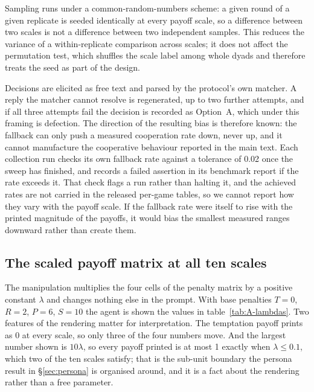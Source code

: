 \documentclass[openacc]{rsproca_new}
\newcommand{\lam}{\lambda}
\begin{document}

Sampling runs under a common-random-numbers scheme: a given round of a given
replicate is seeded identically at every payoff scale, so a difference between
two scales is not a difference between two independent samples. This reduces
the variance of a within-replicate comparison across scales; it does not
affect the permutation test, which shuffles the scale label among whole dyads
and therefore treats the seed as part of the design.

Decisions are elicited as free text and parsed by the protocol's own matcher. A
reply the matcher cannot resolve is regenerated, up to two further attempts,
and if all three attempts fail the decision is recorded as Option~A, which
under this framing is defection. The direction of the resulting bias is
therefore known: the fallback can only push a measured cooperation rate down,
never up, and it cannot manufacture the cooperative behaviour reported in the
main text. Each collection run checks its own fallback rate against a tolerance
of 0.02 once the sweep has finished, and records a failed assertion in its
benchmark report if the rate exceeds it. That check flags a run rather than
halting it, and the achieved rates are not carried in the released per-game
tables, so we cannot report how they vary with the payoff scale. If the fallback rate were itself to rise with the printed magnitude of
the payoffs, it would bias the smallest measured ranges downward rather than
create them.

\subsection{The scaled payoff matrix at all ten scales}\label{appendix:payoff_scaling}

The manipulation multiplies the four cells of the penalty matrix by a positive
constant $\lam$ and changes nothing else in the prompt. With base penalties
$T = 0$, $R = 2$, $P = 6$, $S = 10$ the agent is shown the values in
table~\ref{tab:A-lambdas}. Two features of the rendering matter for
interpretation. The temptation payoff prints as 0 at every scale, so only three
of the four numbers move. And the largest number shown is $10\lam$, so every
payoff printed is at most 1 exactly when $\lam \leq 0.1$, which two of the ten
scales satisfy; that is the sub-unit boundary the persona result in
\S\ref{sec:persona} is organised around, and it is a fact about the rendering
rather than a free parameter.
\end{document}
